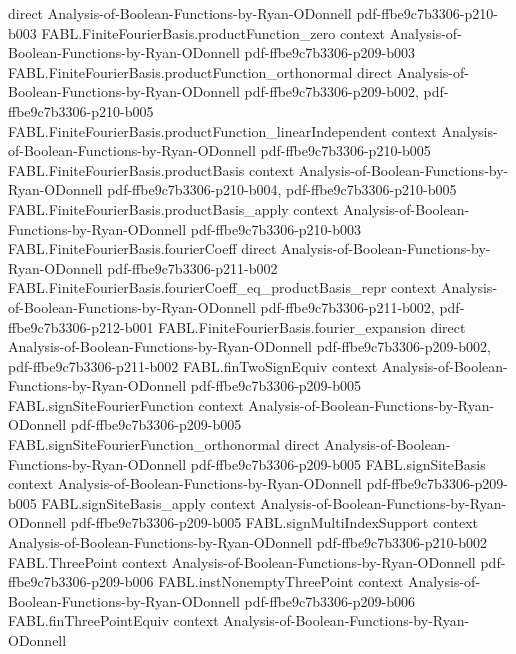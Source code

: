 \begin{theorem}
  {direct}
  {Analysis-of-Boolean-Functions-by-Ryan-ODonnell}
  {pdf-ffbe9c7b3306-p210-b003}
\proofstep
  {FABL.FiniteFourierBasis.productFunction_zero}
  {context}
  {Analysis-of-Boolean-Functions-by-Ryan-ODonnell}
  {pdf-ffbe9c7b3306-p209-b003}
\proofstep
  {FABL.FiniteFourierBasis.productFunction_orthonormal}
  {direct}
  {Analysis-of-Boolean-Functions-by-Ryan-ODonnell}
  {pdf-ffbe9c7b3306-p209-b002,
    pdf-ffbe9c7b3306-p210-b005}
\proofstep
  {FABL.FiniteFourierBasis.productFunction_linearIndependent}
  {context}
  {Analysis-of-Boolean-Functions-by-Ryan-ODonnell}
  {pdf-ffbe9c7b3306-p210-b005}
\proofstep
  {FABL.FiniteFourierBasis.productBasis}
  {context}
  {Analysis-of-Boolean-Functions-by-Ryan-ODonnell}
  {pdf-ffbe9c7b3306-p210-b004,
    pdf-ffbe9c7b3306-p210-b005}
\proofstep
  {FABL.FiniteFourierBasis.productBasis_apply}
  {context}
  {Analysis-of-Boolean-Functions-by-Ryan-ODonnell}
  {pdf-ffbe9c7b3306-p210-b003}
\proofstep
  {FABL.FiniteFourierBasis.fourierCoeff}
  {direct}
  {Analysis-of-Boolean-Functions-by-Ryan-ODonnell}
  {pdf-ffbe9c7b3306-p211-b002}
\proofstep
  {FABL.FiniteFourierBasis.fourierCoeff_eq_productBasis_repr}
  {context}
  {Analysis-of-Boolean-Functions-by-Ryan-ODonnell}
  {pdf-ffbe9c7b3306-p211-b002,
    pdf-ffbe9c7b3306-p212-b001}
\proofstep
  {FABL.FiniteFourierBasis.fourier_expansion}
  {direct}
  {Analysis-of-Boolean-Functions-by-Ryan-ODonnell}
  {pdf-ffbe9c7b3306-p209-b002,
    pdf-ffbe9c7b3306-p211-b002}
\proofstep
  {FABL.finTwoSignEquiv}
  {context}
  {Analysis-of-Boolean-Functions-by-Ryan-ODonnell}
  {pdf-ffbe9c7b3306-p209-b005}
\proofstep
  {FABL.signSiteFourierFunction}
  {context}
  {Analysis-of-Boolean-Functions-by-Ryan-ODonnell}
  {pdf-ffbe9c7b3306-p209-b005}
\proofstep
  {FABL.signSiteFourierFunction_orthonormal}
  {direct}
  {Analysis-of-Boolean-Functions-by-Ryan-ODonnell}
  {pdf-ffbe9c7b3306-p209-b005}
\proofstep
  {FABL.signSiteBasis}
  {context}
  {Analysis-of-Boolean-Functions-by-Ryan-ODonnell}
  {pdf-ffbe9c7b3306-p209-b005}
\proofstep
  {FABL.signSiteBasis_apply}
  {context}
  {Analysis-of-Boolean-Functions-by-Ryan-ODonnell}
  {pdf-ffbe9c7b3306-p209-b005}
\proofstep
  {FABL.signMultiIndexSupport}
  {context}
  {Analysis-of-Boolean-Functions-by-Ryan-ODonnell}
  {pdf-ffbe9c7b3306-p210-b002}
\proofstep
  {FABL.ThreePoint}
  {context}
  {Analysis-of-Boolean-Functions-by-Ryan-ODonnell}
  {pdf-ffbe9c7b3306-p209-b006}
\proofstep
  {FABL.instNonemptyThreePoint}
  {context}
  {Analysis-of-Boolean-Functions-by-Ryan-ODonnell}
  {pdf-ffbe9c7b3306-p209-b006}
\proofstep
  {FABL.finThreePointEquiv}
  {context}
  {Analysis-of-Boolean-Functions-by-Ryan-ODonnell}

\end{theorem}
